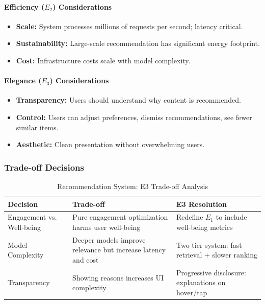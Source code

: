\paragraph{Efficiency ($E_2$) Considerations}

\begin{itemize}[leftmargin=2em]
    \item \textbf{Scale:} System processes millions of requests per second; latency critical.
    \item \textbf{Sustainability:} Large-scale recommendation has significant energy footprint.
    \item \textbf{Cost:} Infrastructure costs scale with model complexity.
\end{itemize}

\paragraph{Elegance ($E_3$) Considerations}

\begin{itemize}[leftmargin=2em]
    \item \textbf{Transparency:} Users should understand why content is recommended.
    \item \textbf{Control:} Users can adjust preferences, dismiss recommendations, see fewer similar items.
    \item \textbf{Aesthetic:} Clean presentation without overwhelming users.
\end{itemize}

\subsubsection{Trade-off Decisions}

\begin{table}[h]
\centering
\caption{Recommendation System: E3 Trade-off Analysis}
\label{tab:rec_tradeoff}
\small
\begin{tabularx}{\columnwidth}{@{}l X X@{}}
\toprule
\textbf{Decision} & \textbf{Trade-off} & \textbf{E3 Resolution} \\
\midrule
Engagement vs. Well-being & Pure engagement optimization harms user well-being & Redefine $E_1$ to include well-being metrics \\
Model Complexity & Deeper models improve relevance but increase latency and cost & Two-tier system: fast retrieval + slower ranking \\
Transparency & Showing reasons increases UI complexity & Progressive disclosure: explanations on hover/tap \\
\bottomrule
\end{tabularx}
\end{table}

